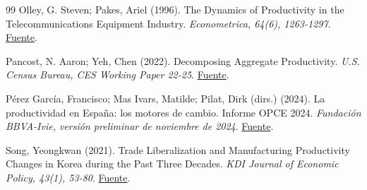 \begin{thebibliography}{99}
 Olley, G. Steven; Pakes, Ariel (1996). The Dynamics of Productivity in the Telecommunications Equipment Industry. \emph{Econometrica, 64(6), 1263-1297}. \href{https://www.nber.org/papers/w3977}{Fuente}.

 Pancost, N. Aaron; Yeh, Chen (2022). Decomposing Aggregate Productivity. \emph{U.S. Census Bureau, CES Working Paper 22-25}. \href{https://www.census.gov/library/working-papers/2022/adrm/CES-WP-22-25.html}{Fuente}.

 Pérez García, Francisco; Mas Ivars, Matilde; Pilat, Dirk (dirs.) (2024). La productividad en España: los motores de cambio. Informe OPCE 2024. \emph{Fundación BBVA-Ivie, versión preliminar de noviembre de 2024}. \href{https://www.fbbva.es/wp-content/uploads/2025/01/DE_2025_productividad_espana_motores_de_cambio_informe_opce_2024_version_preliminar.pdf}{Fuente}.

 Song, Yeongkwan (2021). Trade Liberalization and Manufacturing Productivity Changes in Korea during the Past Three Decades. \emph{KDI Journal of Economic Policy, 43(1), 53-80}. \href{https://doi.org/10.23895/kdijep.2021.43.1.53}{Fuente}.

\end{thebibliography}